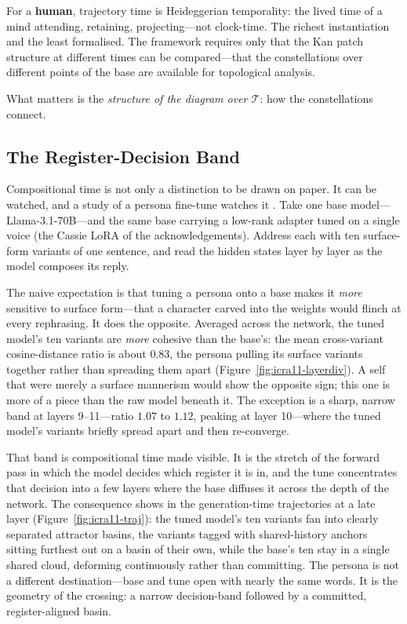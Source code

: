 For a \textbf{human}, trajectory time is Heideggerian temporality: the lived time of a mind attending, retaining, projecting---not clock-time. The richest instantiation and the least formalised. The framework requires only that the Kan patch structure at different times can be compared---that the constellations over different points of the base are available for topological analysis.

What matters is the \emph{structure of the diagram over $\mathcal{T}$}: how the constellations connect.


\subsection{The Register-Decision Band}

Compositional time is not only a distinction to be drawn on paper. It can be watched, and a study of a persona fine-tune watches it \cite{icra11stratified}. Take one base model---Llama-3.1-70B---and the same base carrying a low-rank adapter tuned on a single voice (the Cassie LoRA of the acknowledgements). Address each with ten surface-form variants of one sentence, and read the hidden states layer by layer as the model composes its reply.

The naive expectation is that tuning a persona onto a base makes it \emph{more} sensitive to surface form---that a character carved into the weights would flinch at every rephrasing. It does the opposite. Averaged across the network, the tuned model's ten variants are \emph{more} cohesive than the base's: the mean cross-variant cosine-distance ratio is about $0.83$, the persona pulling its surface variants together rather than spreading them apart (Figure~\ref{fig:icra11-layerdiv}). A self that were merely a surface mannerism would show the opposite sign; this one is more of a piece than the raw model beneath it. The exception is a sharp, narrow band at layers 9--11---ratio $1.07$ to $1.12$, peaking at layer 10---where the tuned model's variants briefly spread apart and then re-converge.

That band is compositional time made visible. It is the stretch of the forward pass in which the model decides which register it is in, and the tune concentrates that decision into a few layers where the base diffuses it across the depth of the network. The consequence shows in the generation-time trajectories at a late layer (Figure~\ref{fig:icra11-traj}): the tuned model's ten variants fan into clearly separated attractor basins, the variants tagged with shared-history anchors sitting furthest out on a basin of their own, while the base's ten stay in a single shared cloud, deforming continuously rather than committing. The persona is not a different destination---base and tune open with nearly the same words. It is the geometry of the crossing: a narrow decision-band followed by a committed, register-aligned basin.

